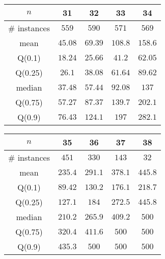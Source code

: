 \begin{tabular}{c|cccc} 
\hline 
$n$ & 31 & 32 & 33 & 34 \tabularnewline 
\hline 
\hline 
\# instances & $559$ & $590$ & $571$ & $569$ \tabularnewline 
mean & $45.08$ & $69.39$ & $108.8$ & $158.6$ \tabularnewline 
Q(0.1) & $18.24$ & $25.66$ & $41.2$ & $62.05$ \tabularnewline 
Q(0.25) & $26.1$ & $38.08$ & $61.64$ & $89.62$ \tabularnewline 
median & $37.48$ & $57.44$ & $92.08$ & $137$ \tabularnewline 
Q(0.75) & $57.27$ & $87.37$ & $139.7$ & $202.1$ \tabularnewline 
Q(0.9) & $76.43$ & $124.1$ & $197$ & $282.1$ \tabularnewline 
\hline 
\end{tabular} 
\medskip{} 

\begin{tabular}{c|cccc} 
\hline 
$n$ & 35 & 36 & 37 & 38 \tabularnewline 
\hline 
\hline 
\# instances & $451$ & $330$ & $143$ & $32$ \tabularnewline 
mean & $235.4$ & $291.1$ & $378.1$ & $445.8$ \tabularnewline 
Q(0.1) & $89.42$ & $130.2$ & $176.1$ & $218.7$ \tabularnewline 
Q(0.25) & $127.1$ & $184$ & $272.5$ & $445.8$ \tabularnewline 
median & $210.2$ & $265.9$ & $409.2$ & $500$ \tabularnewline 
Q(0.75) & $320.4$ & $411.6$ & $500$ & $500$ \tabularnewline 
Q(0.9) & $435.3$ & $500$ & $500$ & $500$ \tabularnewline 
\hline 
\end{tabular} 
\medskip{} 

